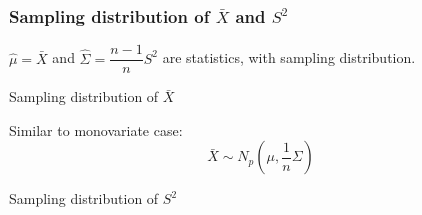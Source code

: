         
\subsubsection{Sampling distribution of $ \bar{X} $ and $ S^2 $}
        $ \hat{\mu}=\bar{X} $ and $ \hat{\Sigma}=\dfrac{n-1}{n}S^2 $ are statistics, with sampling distribution.



    \begin{point}
        Sampling distribution of $ \bar{X} $
    \end{point}

    Similar to monovariate case:
    \[
        \bar{X}\sim N_p(\mu,\dfrac{1}{n}\Sigma ) 
    \]
    
    \begin{point}
        Sampling distribution of $ S^2 $
    \end{point}
    

